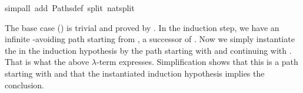 \begin{isabellebody}
\isamarkupfalse%
{}simp{}all\ add{}\ Paths{}def\ split{}\ nat{}split{}\isanewline
{}\isamarkupfalse%
%
\endisatagproof
{\isafoldproof}%
%
\isadelimproof
%
\endisadelimproof
%
\begin{isamarkuptext}%
\noindent
The base case () is trivial and proved by .
In the induction step, we have an infinite -avoiding path 
starting from , a successor of . Now we simply instantiate
the  in the induction hypothesis by the path starting with
 and continuing with . That is what the above $\lambda$-term
expresses.  Simplification shows that this is a path starting with  
and that the instantiated induction hypothesis implies the conclusion.


\end{isamarkuptext}
\end{isabellebody}

